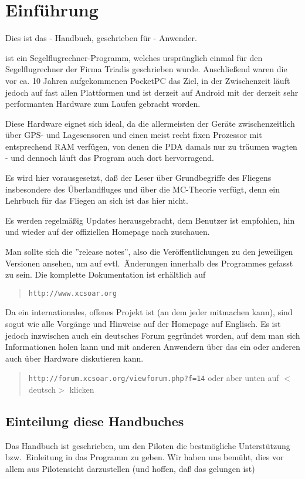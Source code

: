 \chapter{Einführung}\label{cha:introduction}
Dies ist das \xc - Handbuch, geschrieben für \xc - Anwender. 


\xc ist ein Segelflugrechner-Programm, welches ursprünglich einmal für den Segelflugrechner \al der Firma Triadis geschrieben wurde.  
Anschließend waren die vor ca. 10 Jahren aufgekommenen PocketPC das Ziel, in der Zwischenzeit läuft \xc jedoch auf fast allen Plattformen und ist derzeit auf Android mit der derzeit 
sehr performanten Hardware zum Laufen gebracht worden. 

Diese Hardware eignet sich ideal, da die allermeisten der Geräte zwischenzeitlich über GPS- und Lagesensoren und einen 
meist recht fixen Prozessor mit entsprechend RAM verfügen, von denen die PDA damals nur zu träumen wagten - und dennoch 
läuft das Program auch dort hervorragend. 


Es wird hier vorausgesetzt, daß der Leser über Grundbegriffe des Fliegens insbesondere des Überlandfluges 
und über die MC-Theorie verfügt, denn ein Lehrbuch für das Fliegen an sich ist das hier nicht.


Es werden regelmäßig Updates herausgebracht, dem Benutzer ist empfohlen, hin und wieder auf der offiziellen Homepage nach zuschauen. 

Man sollte sich die ''release notes'', also die Veröffentlichungen zu den jeweiligen Versionen ansehen, um  auf evtl.\ Änderungen innerhalb des Programmes gefasst zu sein. 
Die komplette Dokumentation ist erhältlich auf  

\begin{quote}
{\tt http://www.xcsoar.org}
\end{quote}

Da \xc ein internationales, offenes Projekt ist (an dem jeder mitmachen kann), sind sogut wie alle Vorgänge und Hinweise auf der Homepage auf Englisch. 
Es ist jedoch inzwischen auch ein deutsches Forum gegründet worden, auf dem man sich Informationen holen kann und mit anderen Anwendern über das ein oder anderen auch über Hardware diskutieren kann.

\begin{quote}
{\tt http://forum.xcsoar.org/viewforum.php?f=14}  \qquad oder aber unten auf $<$deutsch$>$ klicken
\end{quote}


\section{Einteilung diese Handbuches}
Das Handbuch ist geschrieben, um den Piloten die bestmögliche Unterstützung bzw.\ Einleitung in das Programm zu geben. 
Wir haben uns bemüht, dies vor allem aus Pilotensicht darzustellen (und hoffen, daß das gelungen ist) 

